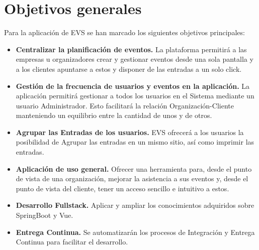 
\section{Objetivos generales}

Para la aplicación de EVS se han marcado los siguientes objetivos principales:
\begin{itemize}
    \item \textbf{Centralizar la planificación de eventos.} La plataforma permitirá a las empresas u organizadores crear y gestionar eventos desde una sola pantalla y a los clientes apuntarse a estos y
    disponer de las entradas a un solo click.
    \item \textbf{Gestión de la frecuencia de usuarios y eventos en la aplicación.} La aplicación permitirá gestionar a todos los usuarios en el Sistema
    mediante un usuario Administrador. Esto facilitará la relación Organización-Cliente manteniendo un equilibrio entre la cantidad de unos y de otros.
    \item \textbf{Agrupar las Entradas de los usuarios.}  EVS ofrecerá a los usuarios la posibilidad de Agrupar las entradas en un mismo sitio, así como imprimir las entradas.
    \item \textbf{Aplicación de uso general.} Ofrecer una herramienta para, desde el punto de vista de una organización, mejorar la asistencia a sus eventos
    y, desde el punto de vista del cliente, tener un acceso sencillo e intuitivo a estos.
    \item \textbf{Desarrollo Fullstack.} Aplicar y ampliar los conocimientos adquiridos sobre SpringBoot y Vue.
    \item \textbf{Entrega Continua.} Se automatizarán los procesos de Integración y Entrega Continua para facilitar el desarrollo.
    \end{itemize}
   


